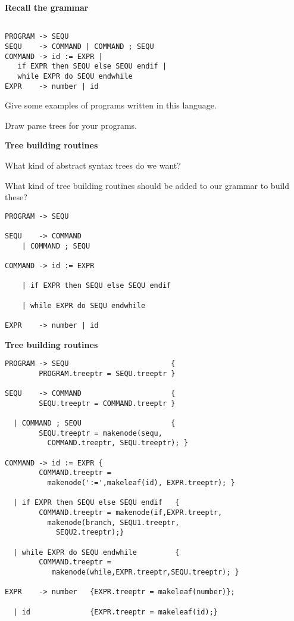 %
%
\begin{slide}{}
{\bf Recall the grammar}
\begin{verbatim}

PROGRAM -> SEQU
SEQU    -> COMMAND | COMMAND ; SEQU
COMMAND -> id := EXPR |
   if EXPR then SEQU else SEQU endif |
   while EXPR do SEQU endwhile
EXPR    -> number | id

\end{verbatim}

Give some examples of programs written in this language.

Draw parse trees for your programs.
\end{slide}

%
%
\begin{slide}{}
{\bf Tree building routines}

What kind of abstract syntax trees do we want?

What kind of tree building routines should be added to our grammar
to build these?
\begin{verbatim}
PROGRAM -> SEQU 

SEQU    -> COMMAND 
    | COMMAND ; SEQU

COMMAND -> id := EXPR 

    | if EXPR then SEQU else SEQU endif 

    | while EXPR do SEQU endwhile

EXPR    -> number | id
\end{verbatim}
\end{slide}
\begin{slide}{}
{\small
{\bf Tree building routines}
\begin{verbatim}
PROGRAM -> SEQU                        { 
        PROGRAM.treeptr = SEQU.treeptr }

SEQU    -> COMMAND                     { 
        SEQU.treeptr = COMMAND.treeptr }

  | COMMAND ; SEQU                     { 
        SEQU.treeptr = makenode(sequ,
          COMMAND.treeptr, SEQU.treeptr); }
  
COMMAND -> id := EXPR { 
        COMMAND.treeptr =
          makenode(':=',makeleaf(id), EXPR.treeptr); }

  | if EXPR then SEQU else SEQU endif   {
        COMMAND.treeptr = makenode(if,EXPR.treeptr, 
          makenode(branch, SEQU1.treeptr, 
            SEQU2.treeptr);}

  | while EXPR do SEQU endwhile         { 
        COMMAND.treeptr =
           makenode(while,EXPR.treeptr,SEQU.treeptr); }
 
EXPR    -> number   {EXPR.treeptr = makeleaf(number)};

  | id              {EXPR.treeptr = makeleaf(id);}

\end{verbatim}
}
\end{slide}

